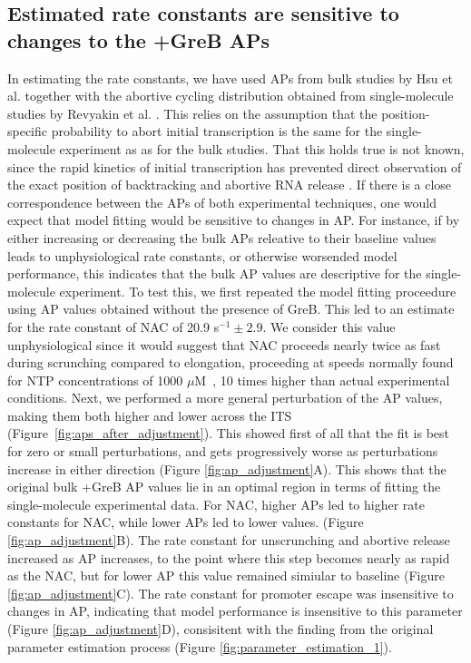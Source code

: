 \subsection{Estimated rate constants are sensitive to changes to the +GreB 
APs}
In estimating the rate constants, we have used APs from bulk studies by Hsu
et al. \cite{hsu_initial_2006} together with the abortive cycling distribution
obtained from single-molecule studies by Revyakin et al.
\cite{revyakin_abortive_2006}. This relies on the assumption that the
position-specific probability to abort initial transcription is the same for
the single-molecule experiment as as for the bulk studies. That this holds
true is not known, since the rapid kinetics of initial transcription
has prevented direct observation of the exact position of backtracking and abortive
RNA release \cite{margeat_direct_2006, revyakin_abortive_2006}. If there is a
close correspondence between the APs of both experimental techniques, one
would expect that model fitting would be sensitive to changes in AP. For
instance, if by either increasing or decreasing the bulk APs releative to
their baseline values leads to unphysiological rate constants, or
otherwise worsended model performance, this indicates that the bulk
AP values are descriptive for the single-molecule experiment.
To test this, we first repeated the model fitting proceedure using AP values
obtained without the presence of GreB. This led to an estimate for the rate
constant of NAC of 20.9 s$^{-1} \pm 2.9$.
We consider this value unphysiological since it would suggest that NAC
proceeds nearly twice as fast during scrunching compared to elongation,
proceeding at speeds normally found for NTP concentrations of 1000
$\mu$M~\cite{bai_mechanochemical_2007}, 10 times higher than actual
experimental conditions. Next, we performed a more general
perturbation of the AP values, making them both higher and lower across the
ITS (Figure~\ref{fig:aps_after_adjustment}). This showed first of all that the
fit is best for zero or small perturbations, and gets progressively worse as
perturbations increase in either direction (Figure \ref{fig:ap_adjustment}A).
This shows that the original bulk +GreB AP values lie in an optimal region in
terms of fitting the single-molecule experimental data. For NAC, higher APs
led to higher rate constants for NAC, while lower APs led to lower values.
(Figure \ref{fig:ap_adjustment}B). The rate constant for unscrunching and
abortive release increased as AP increases, to the point where this
step becomes nearly as rapid as the NAC, but for lower AP this value remained
simiular to baseline (Figure \ref{fig:ap_adjustment}C). The rate constant for
promoter escape was insensitive to changes in AP, indicating that model
performance is insensitive to this parameter (Figure
\ref{fig:ap_adjustment}D), consisitent with the finding from the original
parameter estimation process (Figure \ref{fig:parameter_estimation_1}).

